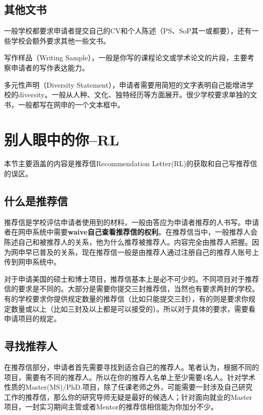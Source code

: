 \subsection{其他文书}

一般学校都要求申请者提交自己的CV和个人陈述（PS、SoP其一或都要），还有一些学校会额外要求其他一些文书。\par

写作样品（Writing Sample），一般是你写的课程论文或学术论文的片段，主要考察申请者的写作表达能力。\par

多元性声明（Diversity Statement），申请者需要用简短的文字表明自己能增进学校的diversity。一般从人种、文化、独特经历等方面展开。很少学校要求单独的文书，一般都写在网申的一个文本框中。

\section{别人眼中的你--RL}
本节主要涵盖的内容是推荐信Recommendation Letter(RL)的获取和自己写推荐信的误区。
\subsection{什么是推荐信}
推荐信是学校评估申请者使用到的材料，一般由答应为申请者推荐的人书写。申请者在网申系统中需要\textbf{waive自己查看推荐信的权利}。在推荐信当中，一般推荐人会陈述自己和被推荐人的关系，他为什么推荐被推荐人。内容完全由推荐人把握。因为网申早已普及的关系，现在推荐信一般是由推荐人通过注册自己的推荐人账号上传到网申系统中。\par

对于申请美国的硕士和博士项目，推荐信基本上是必不可少的。不同项目对于推荐信的要求是不同的。大部分是需要你提交三封推荐信，当然也有要求两封的学校。有的学校要求你提供规定数量的推荐信（比如只能提交三封），有的则是要求你规定数量或以上（比如三封及以上都是可以接受的）。所以对于具体的要求，需要看申请项目的规定。\par

\subsection{寻找推荐人}
在推荐信部分，申请者首先需要寻找到适合自己的推荐人。笔者认为，根据不同的项目，需要有不同的推荐人。所以在你的推荐人名单上至少需要4名人。针对学术性质的Master(MS)/PhD.项目，除了任课老师之外，可能需要一封涉及自己研究工作的推荐信，那么你的研究导师无疑是最好的候选人；针对面向就业的Master项目，一封实习期间主管或者Mentor的推荐信相信能为你加分不少。\par

